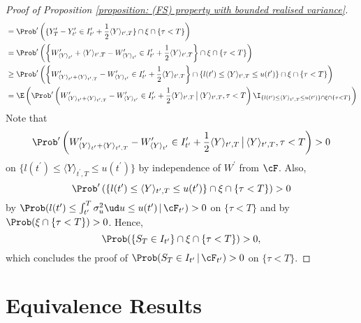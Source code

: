 \documentclass[11pt]{article}
\begin{document}
\begin{proof}[Proof of Proposition \ref{proposition: (FS) property with bounded realised variance}]
\begin{align*}
%
%
%
&= \Prob^\prime \left( \{ Y^\prime_T - Y^\prime_{t^\prime} \in I^\prime_{t^\prime} + \frac{1}{2} \langle Y \rangle_{{t^\prime},T}  \} \cap \xi \cap \{ \tau < T \} \right) \\
%
%
%
&= \Prob^\prime \left( \left\{ W^\prime_{\langle Y \rangle_{t^\prime}} + \langle Y \rangle_{t^\prime,T} - W^\prime_{\langle Y \rangle_{t^\prime}} \in I^\prime_{t^\prime} + \frac{1}{2} \langle Y \rangle_{t^\prime,T} \right\} \cap \xi \cap \{ \tau < T \} \right) \\
%
%
%
&\geq \Prob^\prime \left( \left\{ W^\prime_{\langle Y \rangle_{t^\prime} + \langle Y \rangle_{t^\prime,T}} - W^\prime_{\langle Y \rangle_{t^\prime}} \in I^\prime_{t^\prime} + \frac{1}{2} \langle Y \rangle_{t^\prime,T} \right\} \cap \left\{ l({t^\prime}) \leq \langle Y \rangle_{t^\prime,T} \leq u({t^\prime}) \right\} \cap \xi \cap \{ \tau < T \} \right) \\
%
%
%
&=\E \left( \Prob^\prime \left( W^\prime_{\langle Y \rangle_{t^\prime} + \langle Y \rangle_{t^\prime,T}} - W^\prime_{\langle Y \rangle_{t^\prime}} \in I^\prime_{t^\prime} + \frac{1}{2} \langle Y \rangle_{{t^\prime},T}  \, \big{|} \, \langle Y \rangle_{t^\prime,T}, \tau < T \right) \I_{\{ l({t^\prime}) \leq \langle Y \rangle_{t^\prime,T} \leq u({t^\prime}) \} \cap \xi \cap \{ \tau < T \}} \right)
\end{align*}
Note that 
$$
\Prob^\prime \left( W^\prime_{\langle Y \rangle_{t^\prime} + \langle Y \rangle_{t^\prime,T}} - W^\prime_{\langle Y \rangle_{t^\prime}} \in I^\prime_{t^\prime} + \frac{1}{2} \langle Y \rangle_{{t^\prime},T}  \, \big{|} \, \langle Y \rangle_{{t^\prime},T}, \tau < T \right) > 0
$$
on $\{ l({t^\prime}) \leq \langle Y \rangle_{{t^\prime},T} \leq u({t^\prime}) \}$ by independence of $W^\prime$ from $\cF$. Also, 
$$
\Prob^\prime \left( \{ l(t^\prime) \leq \langle Y \rangle_{t^\prime,T} \leq u(t^\prime) \} \cap \xi \cap \{ \tau < T \} \right) > 0
$$ 
by $\Prob( l(t^\prime) \leq \int_{t^\prime}^T \sigma_u^2 \ud u \leq u(t^\prime) \, | \, \cF_{t^\prime}) > 0$ on $\{ \tau < T \}$ and by $\Prob(\xi \cap \{ \tau < T \}) > 0$. Hence,
$$
\Prob( \{ S_T \in I_{t^\prime} \} \cap \xi \cap \{ \tau < T \} ) > 0,
$$
which concludes the proof of $\Prob( S_T \in I_{t^\prime} \, | \, \cF_{t^\prime} ) > 0$ on $\{ \tau < T \}$.

\end{proof}


\section{Equivalence Results}
\label{appendix: equivalence}
\end{document}

